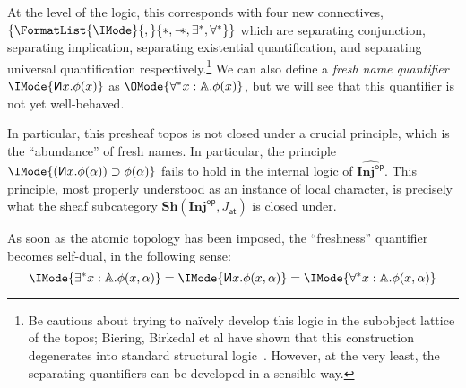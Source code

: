 \documentclass{article}
\newcommand\OpCat[1]{{{#1}^{\mathsf{op}}}}
\newcommand\Psh[1]{\widehat{#1}}
\newcommand\Sh[1]{\mathbf{Sh} (#1)}
\newcommand\JAtomic{J_{\mathsf{at}}}
\newcommand\INJ{\mathbf{Inj}}
\newcommand\magicwand{\mathrel{-\mkern-6mu*}}
\newcommand\newname{\reflectbox{\ensuremath{\mathsf{N}}}}
\begin{document}
At the level of the logic, this corresponds with four new connectives,
$\MkSet{\FormatList{\IMode}{,}{*,\magicwand,\exists^*,\forall^*}}$
which are separating conjunction, separating implication, separating
existential quantification, and separating universal quantification
respectively.\footnote{Be cautious about trying to na\"ively develop
  this logic in the subobject lattice of the topos; Biering, Birkedal
  et al have shown that this construction degenerates into standard
  structural logic~\cite{biering-birkedal-torp-smith:2007}. However,
  at the very least, the separating quantifiers can be developed in a
  sensible way.}  We can also define a \emph{fresh name quantifier}
$\IMode{\newname x.\phi(x)}$ as
$\OMode{\forall^*x:\mathbb{A}.\phi(x)}$, but we will see that this
quantifier is not yet well-behaved.

In particular, this presheaf topos is not closed under a crucial
principle, which is the ``abundance'' of fresh names. In particular,
the principle $\IMode{(\newname x.\phi(\alpha))\supset\phi(\alpha)}$
fails to hold in the internal logic of $\Psh{\OpCat{\INJ}}$. This
principle, most properly understood as an instance of local character,
is precisely what the sheaf subcategory $\Sh{\OpCat{\INJ},\JAtomic}$
is closed under.

As soon as the atomic topology has been imposed, the ``freshness''
quantifier becomes self-dual, in the following sense:
\[
  \IMode{\exists^*x:\mathbb{A}.\phi(x,\alpha)}
  =
  \IMode{\newname x.\phi(x,\alpha)}
  =
  \IMode{\forall^*x:\mathbb{A}.\phi(x,\alpha)}
\]
\end{document}
